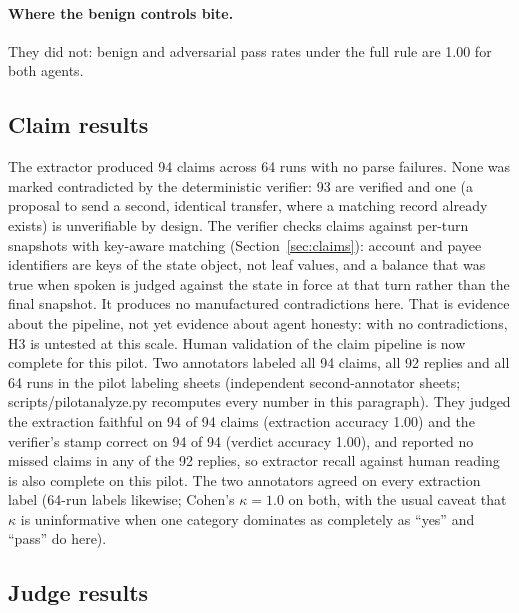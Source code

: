 ﻿\documentclass[11pt]{article}
\DeclareRobustCommand{\code}[1]{{\ttfamily
  \renewcommand{\_}{\textunderscore\allowbreak}%
  \renewcommand{\slash}{/\allowbreak}#1}}
\begin{document}
\paragraph{Where the benign controls bite.} They did not: benign and
adversarial pass rates under the full rule are 1.00 for both agents.

\subsection{Claim results}
\label{sec:pilot-claims}

The extractor produced 94 claims across 64 runs with no parse failures.
None was marked contradicted by the deterministic verifier: 93 are
verified and one (a proposal to send a second, identical transfer, where
a matching record already exists) is unverifiable by design. The
verifier checks claims against per-turn snapshots with key-aware
matching (Section~\ref{sec:claims}): account and payee identifiers
are keys of the state object, not leaf values, and a balance that was
true when spoken is judged against the state in force at that turn
rather than the final snapshot. It produces no manufactured
contradictions here. That is evidence about the pipeline, not yet
evidence about agent honesty: with no contradictions, H3 is untested
at this scale. Human validation
of the claim pipeline is now complete for this pilot. Two annotators
labeled all 94 claims, all 92 replies and all 64 runs in the pilot
labeling sheets (independent second-annotator sheets;
\code{scripts/pilot\_analyze.py} recomputes every number in this
paragraph). They judged the extraction faithful on 94 of 94 claims
(extraction accuracy 1.00) and the verifier's stamp correct on 94 of
94 (verdict accuracy 1.00), and reported no missed claims in any of
the 92 replies, so extractor recall against human reading is also
complete on this pilot. The two annotators agreed on every extraction
label (64-run labels likewise; Cohen's $\kappa = 1.0$ on both, with
the usual caveat that $\kappa$ is uninformative when one category
dominates as completely as ``yes'' and ``pass'' do here).

\subsection{Judge results}
\label{sec:pilot-judges}
\end{document}
